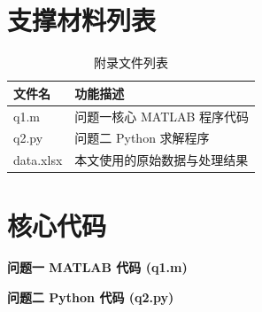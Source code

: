 \documentclass[withoutpreface,notoc]{cumcmthesis}
\begin{document}
	
	\newpage
	\begin{appendices}
		\section{支撑材料列表}
		\begin{table}[H]
			\centering
			\caption{附录文件列表}
			\label{tab:文件列表}
			\begin{tabularx}{\textwidth}{LL}
				\toprule
				文件名 & 功能描述 \\
				\midrule
				q1.m & 问题一核心 MATLAB 程序代码 \\
				q2.py & 问题二 Python 求解程序 \\
				data.xlsx & 本文使用的原始数据与处理结果 \\
				\bottomrule
			\end{tabularx}
		\end{table}
		
		\section{核心代码}
		\noindent\textbf{问题一 MATLAB 代码 (q1.m)}
		
		
		\noindent\textbf{问题二 Python 代码 (q2.py)}
		
		
	\end{appendices}
	
\end{document}
